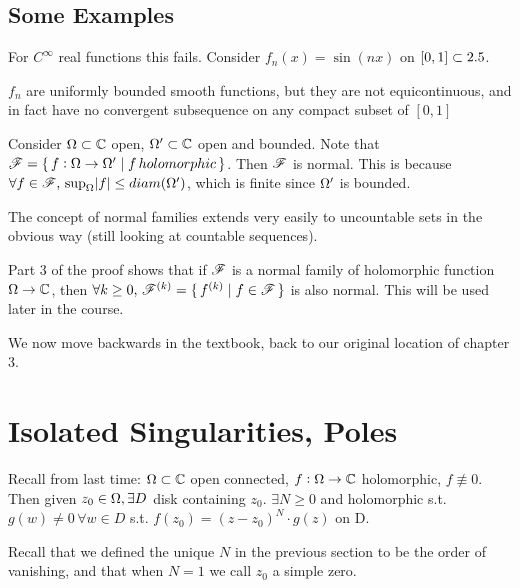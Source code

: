 \subsection{Some Examples}

\begin{example}
For $C^\infty$ real functions this fails. Consider $f_n(x) = \sin(nx)$ on $[0,1] \subset 2.5$.

$f_n$ are uniformly bounded smooth functions, but they are not equicontinuous, and in fact have no convergent subsequence on any compact subset of $[0,1]$


\end{example}


\begin{example}

Consider $\Omega \subset \mathbb{C}$ open, $\Omega ' \subset \mathbb{C}$ open and bounded. Note that $\mathscr{F} = \set{ f: \Omega\to \Omega' \mid f \, holomorphic  }$. Then $\mathscr{F}$ is normal. This is because $\forall f \in \mathscr{F}, \, \sup_{\Omega} \abs{f} \leq diam(\Omega ')$, which is finite since $\Omega ' $ is bounded.

\end{example}


\begin{note}
The concept of normal families extends very easily to uncountable sets in the obvious way (still looking at countable sequences).
\end{note}

\begin{remark}
Part 3 of the proof shows that if $\mathscr{F}$ is a normal family of holomorphic function $\Omega \to \mathbb{C}$, then $\forall k\geq 0, \, \mathscr{F}^{(k)} = \set{f^{(k)} \mid f \in \mathscr{F}}$ is also normal. This will be used later in the course.
\end{remark}

We now move backwards in the textbook, back to our original location of chapter 3.


\section{Isolated Singularities, Poles}

Recall from last time: $\Omega \subset \mathbb{C} $ open connected, $f:\Omega \rightarrow \mathbb{C}$ holomorphic, $f \nequiv 0$. Then given $z_0 \in \Omega, \exists D $ disk containing $z_0$. $\exists N \geq 0$ and holomorphic s.t. $g(w) \neq 0 \, \forall w \in D$ s.t. $f(z_0) = (z-z_0)^N \cdot g(z) $ on D.

Recall that we defined the unique $N$ in the previous section to be the order of vanishing, and that when $N=1$ we call $z_0$ a simple zero.


